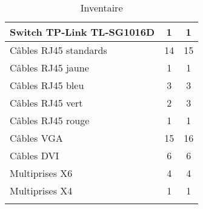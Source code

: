 \begin{center}
\begin{longtable}{|p{10cm}|c|c|}
		\hline Switch TP-Link TL-SG1016D & 1 & 1 \\ 
		\hline Câbles RJ45 standards & 14 & 15 \\ 
		\hline Câbles RJ45 jaune & 1 & 1 \\ 
		\hline Câbles RJ45 bleu & 3 & 3 \\ 
		\hline Câbles RJ45 vert & 2 & 3 \\ 
		\hline Câbles RJ45 rouge & 1 & 1 \\ 
		\hline Câbles VGA & 15 & 16 \\ 
		\hline Câbles DVI & 6 & 6 \\ 
		\hline Multiprises X6 & 4 & 4 \\ 
		\hline Multiprises X4 & 1 & 1 \\
                \hline 
\caption[Inventaire]{Inventaire} \label{grid_mlmmh} \\
\end{longtable}
\end{center}
